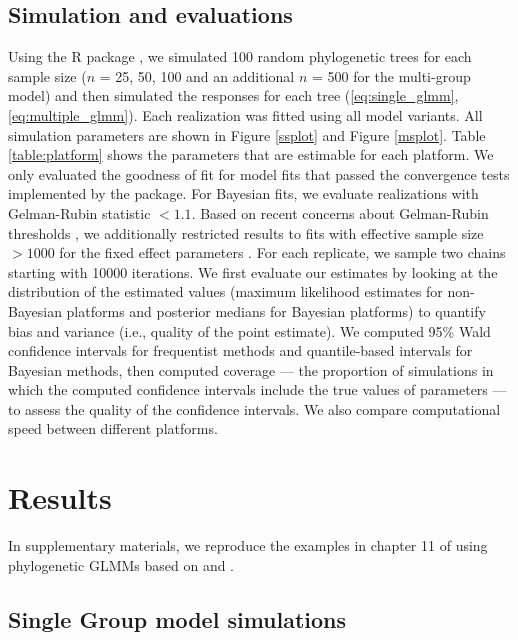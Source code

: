 \documentclass[12pt]{article}
\begin{document}
\subsection*{Simulation and evaluations}

Using the R package  \citep{ape}, we simulated 100 random phylogenetic trees  for each sample size ($n$ = 25, 50, 100 and an additional $n$ = 500 for the multi-group model) and then simulated the responses for each tree (\ref{eq:single_glmm}, \ref{eq:multiple_glmm}). 
Each realization was fitted using all model variants. 
All simulation parameters are shown in Figure \ref{ssplot} and Figure \ref{msplot}. 
Table \ref{table:platform} shows the parameters that are estimable for each platform. 
We only evaluated the goodness of fit for model fits that passed the convergence tests implemented by the package.
For Bayesian fits, we evaluate realizations with Gelman-Rubin statistic $<1.1$. Based on recent concerns about Gelman-Rubin thresholds \citep{vats2018revisiting}, we additionally restricted results to fits with  effective sample size $>1000$ for the fixed effect parameters  \citep[$\beta_{0}$ and $\beta_{1}$: ][]{vehtari2019rank}. 
For each replicate, we sample two chains starting with 10000 iterations. 
We first evaluate our estimates by looking at the distribution of the estimated values (maximum likelihood estimates for non-Bayesian platforms and posterior medians for Bayesian platforms) to quantify bias and variance (i.e., quality of the point estimate).
We computed 95\% Wald confidence intervals for frequentist methods  and quantile-based intervals for Bayesian methods, then computed coverage --- the proportion of simulations in which the computed confidence intervals include the true values of parameters --- to assess the quality of the confidence intervals.
We also compare computational speed between different platforms.

\section*{Results}

In supplementary materials, we reproduce the examples in chapter 11 of \cite{garamszegi2014modern} using phylogenetic GLMMs based on  and .

\subsection*{Single Group model simulations}
\end{document}
